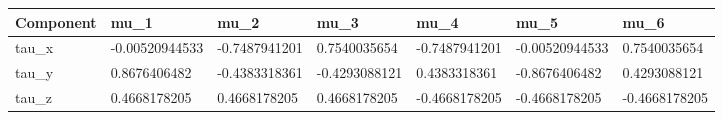 \begin{tabular}{@{}lllllll@{}}
\toprule
Component & mu\_1 & mu\_2 & mu\_3 & mu\_4 & mu\_5 & mu\_6 \\
\midrule
tau\_x & -0.00520944533 & -0.7487941201 & 0.7540035654 & -0.7487941201 & -0.00520944533 & 0.7540035654 \\
tau\_y & 0.8676406482 & -0.4383318361 & -0.4293088121 & 0.4383318361 & -0.8676406482 & 0.4293088121 \\
tau\_z & 0.4668178205 & 0.4668178205 & 0.4668178205 & -0.4668178205 & -0.4668178205 & -0.4668178205 \\
\bottomrule
\end{tabular}
